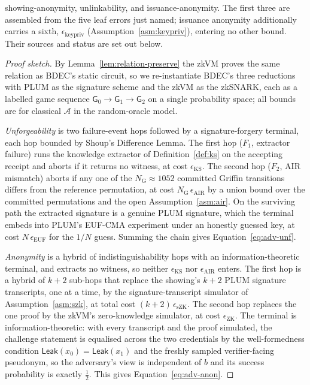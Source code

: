 \begin{theorem}
showing-anonymity, unlinkability, and issuance-anonymity. The first three are assembled from the five leaf errors just named; issuance anonymity additionally carries a sixth, $\epsilon_{\mathrm{keypriv}}$ (Assumption~\ref{asm:keypriv}), entering no other bound. Their sources and status are set out below.
\end{theorem}

\begin{proof}[Proof sketch]
    By Lemma~\ref{lem:relation-preserve} the zkVM proves the same relation as BDEC's static circuit, so we re-instantiate BDEC's three reductions with PLUM as the signature scheme and the zkVM as the zkSNARK, each as a labelled game sequence $\mathsf G_0\to\mathsf G_1\to\mathsf G_2$ on a single probability space; all bounds are for classical $\mathcal A$ in the random-oracle model.
    
    \emph{Unforgeability} is two failure-event hops followed by a signature-forgery terminal, each hop bounded by Shoup's Difference Lemma. The first hop ($F_1$, extractor failure) runs the knowledge extractor of Definition~\ref{def:ks} on the accepting receipt and aborts if it returns no witness, at cost $\epsilon_{\mathrm{KS}}$. The second hop ($F_2$, AIR mismatch) aborts if any one of the $N_{\mathrm G}\approx1052$ committed Griffin transitions differs from the reference permutation, at cost $N_{\mathrm G}\,\epsilon_{\mathrm{AIR}}$ by a union bound over the committed permutations and the open Assumption~\ref{asm:air}. On the surviving path the extracted signature is a genuine PLUM signature, which the terminal embeds into PLUM's EUF-CMA experiment under an honestly guessed key, at cost $N\,\epsilon_{\mathrm{EUF}}$ for the $1/N$ guess. Summing the chain gives Equation~\eqref{eq:adv-unf}.
    
    \emph{Anonymity} is a hybrid of indistinguishability hops with an information-theoretic terminal, and extracts no witness, so neither $\epsilon_{\mathrm{KS}}$ nor $\epsilon_{\mathrm{AIR}}$ enters. The first hop is a hybrid of $k+2$ sub-hops that replace the showing's $k+2$ PLUM signature transcripts, one at a time, by the signature-transcript simulator of Assumption~\ref{asm:szk}, at total cost $(k+2)\,\epsilon_{\mathrm{sZK}}$. The second hop replaces the one proof by the zkVM's zero-knowledge simulator, at cost $\epsilon_{\mathrm{ZK}}$. The terminal is information-theoretic: with every transcript and the proof simulated, the challenge statement is equalised across the two credentials by the well-formedness condition $\mathsf{Leak}(x_0)=\mathsf{Leak}(x_1)$ and the freshly sampled verifier-facing pseudonym, so the adversary's view is independent of $b$ and its success probability is exactly $\tfrac12$. This gives Equation~\eqref{eq:adv-anon}.
    

\end{proof}
